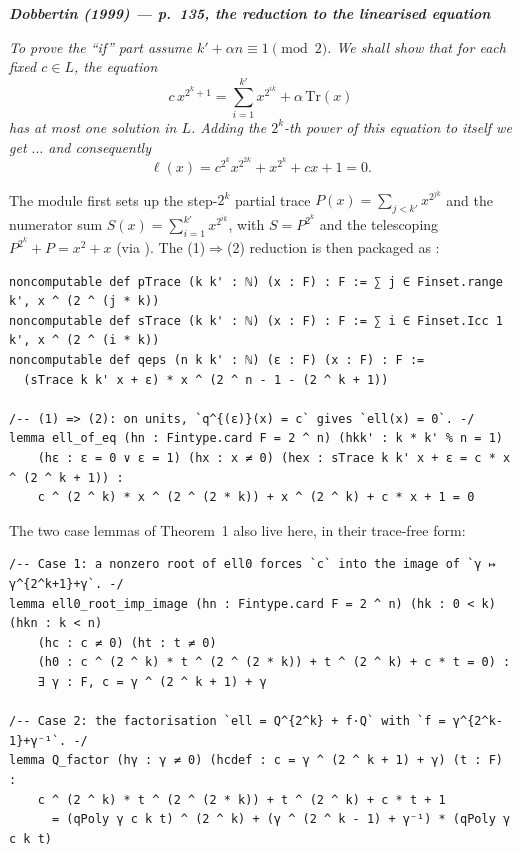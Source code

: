 \documentclass[11pt]{article}
\newenvironment{paperquote}[1]
 {\par\smallskip\noindent
  \def\FrameCommand{\color{quotebar}\vrule width 3pt\hspace{8pt}}%
  \MakeFramed{\advance\hsize-\width \FrameRestore}%
  \small\itshape
  \noindent\normalfont\footnotesize\textbf{\textsf{Dobbertin (1999) --- #1}}\par\nobreak\smallskip\itshape}
 {\endMakeFramed\par\smallskip}
\theoremstyle{definition}
\begin{document}
\begin{paperquote}{p.~135, the reduction to the linearised equation}
To prove the ``if'' part assume $k'+\alpha n\equiv 1\pmod 2$. We shall show
that for each fixed $c\in L$, the equation
\[ c\,x^{2^k+1}=\sum_{i=1}^{k'}x^{2^{ik}}+\alpha\,\mathrm{Tr}(x) \tag{1}\]
has at most one solution in $L$. Adding the $2^k$-th power of this equation to
itself we get $\ldots$ and consequently
\[ \ell(x)=c^{2^k}x^{2^{2k}}+x^{2^k}+cx+1=0. \tag{2}\]
\end{paperquote}

The module first sets up the step-$2^k$ partial trace $P(x)=\sum_{j<k'}x^{2^{jk}}$
and the numerator sum $S(x)=\sum_{i=1}^{k'}x^{2^{ik}}$, with $S=P^{2^k}$ and the
telescoping $P^{2^k}+P=x^2+x$ (via ).  The (1)$\Rightarrow$(2)
reduction is then packaged as :

\begin{lstlisting}
noncomputable def pTrace (k k' : ℕ) (x : F) : F := ∑ j ∈ Finset.range k', x ^ (2 ^ (j * k))
noncomputable def sTrace (k k' : ℕ) (x : F) : F := ∑ i ∈ Finset.Icc 1 k', x ^ (2 ^ (i * k))
noncomputable def qeps (n k k' : ℕ) (ε : F) (x : F) : F :=
  (sTrace k k' x + ε) * x ^ (2 ^ n - 1 - (2 ^ k + 1))

/-- (1) => (2): on units, `q^{(ε)}(x) = c` gives `ell(x) = 0`. -/
lemma ell_of_eq (hn : Fintype.card F = 2 ^ n) (hkk' : k * k' % n = 1)
    (hε : ε = 0 ∨ ε = 1) (hx : x ≠ 0) (hex : sTrace k k' x + ε = c * x ^ (2 ^ k + 1)) :
    c ^ (2 ^ k) * x ^ (2 ^ (2 * k)) + x ^ (2 ^ k) + c * x + 1 = 0
\end{lstlisting}

The two case lemmas of Theorem~1 also live here, in their trace-free form:

\begin{lstlisting}
/-- Case 1: a nonzero root of ell0 forces `c` into the image of `γ ↦ γ^{2^k+1}+γ`. -/
lemma ell0_root_imp_image (hn : Fintype.card F = 2 ^ n) (hk : 0 < k) (hkn : k < n)
    (hc : c ≠ 0) (ht : t ≠ 0)
    (h0 : c ^ (2 ^ k) * t ^ (2 ^ (2 * k)) + t ^ (2 ^ k) + c * t = 0) :
    ∃ γ : F, c = γ ^ (2 ^ k + 1) + γ

/-- Case 2: the factorisation `ell = Q^{2^k} + f·Q` with `f = γ^{2^k-1}+γ⁻¹`. -/
lemma Q_factor (hγ : γ ≠ 0) (hcdef : c = γ ^ (2 ^ k + 1) + γ) (t : F) :
    c ^ (2 ^ k) * t ^ (2 ^ (2 * k)) + t ^ (2 ^ k) + c * t + 1
      = (qPoly γ c k t) ^ (2 ^ k) + (γ ^ (2 ^ k - 1) + γ⁻¹) * (qPoly γ c k t)
\end{lstlisting}
\end{document}
